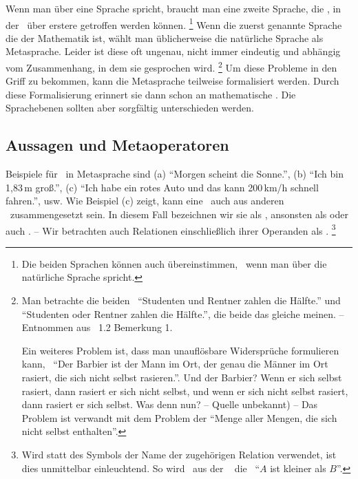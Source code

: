 Wenn man über eine Sprache spricht, braucht man eine zweite Sprache, die , in der \Aussagen\ über erstere getroffen werden können.%
\footnote{%
	Die beiden Sprachen können auch übereinstimmen, \textzB\ wenn man über die natürliche Sprache spricht.
}
Wenn die zuerst genannte Sprache die der Mathematik ist, wählt man üblicherweise die natürliche Sprache als Metasprache.
Leider ist diese oft ungenau, nicht immer eindeutig und abhängig vom Zusammenhang, in dem sie gesprochen wird.%
\footnote{%
	Man betrachte die beiden \Aussagen\ \enquote{Studenten und Rentner zahlen die Hälfte.} und \enquote{Studenten oder Rentner zahlen die Hälfte.}, die beide das gleiche meinen.
	-- Entnommen aus \cite{bib:Rautenberg} \sectionname~1.2 Bemerkung 1.

	Ein weiteres Problem ist, dass man unauflösbare Widersprüche formulieren kann, \textzB\ \enquote{Der Barbier ist der Mann im Ort, der genau die Männer im Ort rasiert, die sich nicht selbst rasieren.}.
	Und der Barbier?
	Wenn er sich selbst rasiert, dann rasiert er sich nicht selbst, und wenn er sich nicht selbst rasiert, dann rasiert er sich selbst.
	Was denn nun?
	-- Quelle unbekannt) --
	Das Problem ist verwandt mit dem Problem der \enquote{Menge aller Mengen, die sich nicht selbst enthalten}.
}
Um diese Probleme in den Griff zu bekommen, kann die Metasprache teilweise formalisiert werden.
Durch diese Formalisierung erinnert sie dann schon an mathematische \Formeln.
Die Sprachebenen sollten aber sorgfältig unterschieden werden.

\subsection{Aussagen und Metaoperatoren}%
\label{sub:AussagenUndMetaoperatoren}
\hidden{\Aussage}%

Beispiele für \Aussagen\ in Metasprache sind
(a) \enquote{Morgen scheint die Sonne.},
(b) \enquote{Ich bin 1,83\,m groß.},
(c) \enquote{Ich habe ein rotes Auto und das kann 200\,km/h schnell fahren.}, usw.
Wie Beispiel (c) zeigt, kann eine \Aussage\ auch aus anderen \Aussagen\ zusammengesetzt sein.
In diesem Fall bezeichnen wir sie als , ansonsten als  oder auch .
-- Wir betrachten auch Relationen einschließlich ihrer Operanden als \Aussagen.%
\footnote{%
	Wird statt des Symbols der Name der zugehörigen Relation verwendet, ist dies unmittelbar einleuchtend.
	So wird \textzB\ aus der \Formel\  die \Aussage\ \enquote{$A$ ist kleiner als $B$}.
}

